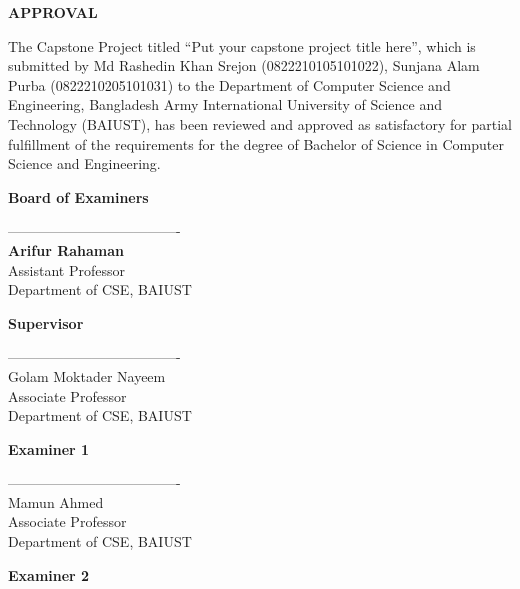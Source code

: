 \clearpage
\thispagestyle{plain}
\begin{center}
    \textbf{\Large APPROVAL}
\end{center}
\vspace{0.5cm}

\noindent
\noindent
\noindent
The Capstone Project titled ``Put your capstone project title here'', which is submitted by Md Rashedin Khan Srejon (0822210105101022), Sunjana Alam Purba (0822210205101031) to the Department of Computer Science and Engineering, Bangladesh Army International University of 
Science and Technology (BAIUST), has been reviewed and approved as satisfactory 
for partial fulfillment of the requirements for the degree of Bachelor of Science in 
Computer Science and Engineering.

\vspace{0.5cm}
\begin{center}
    \textbf{Board of Examiners}
\end{center}
\vspace{1.5cm}

\noindent
\begin{minipage}[t]{0.6\textwidth}
    ------------------------------------- \\
    \textbf{Arifur Rahaman} \\
    Assistant Professor \\
    Department of CSE, BAIUST
\end{minipage}
\hfill
\begin{minipage}[t]{0.35\textwidth}
    \raggedleft
    \textbf{Supervisor}
\end{minipage}

\vspace{1.8cm}
\noindent
\begin{minipage}[t]{0.6\textwidth}
      ------------------------------------- \\
    Golam Moktader Nayeem \\
    Associate Professor \\
    Department of CSE, BAIUST
\end{minipage}
\hfill
\begin{minipage}[t]{0.35\textwidth}
    \raggedleft
    \textbf{Examiner 1}
\end{minipage}

\vspace{1.8cm}
\noindent
\begin{minipage}[t]{0.6\textwidth}
      ------------------------------------- \\
    Mamun Ahmed \\
    Associate Professor \\
    Department of CSE, BAIUST
\end{minipage}
\hfill
\begin{minipage}[t]{0.35\textwidth}
    \raggedleft
    \textbf{Examiner 2}
\end{minipage}

